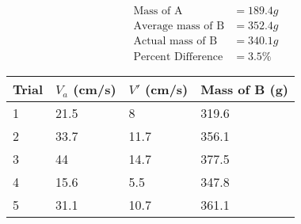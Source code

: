 \begin{equation*}
    \begin{aligned}
        \text{Mass of A}&=189.4g \\
        \text{Average mass of B}&=352.4g \\
        \text{Actual mass of B}&=340.1g \\
        \text{Percent Difference}&=3.5\%
    \end{aligned}    
\end{equation*}
\begin{table}[H]
    \begin{tabular}{|l|l|l|l|}
    \hline
    Trial & $V_a$ (cm/s) & $V'$ (cm/s) & Mass of B (g) \\ \hline
    1     & 21.5        & 8         & 319.6         \\ \hline
    2     & 33.7        & 11.7      & 356.1         \\ \hline
    3     & 44          & 14.7      & 377.5         \\ \hline
    4     & 15.6        & 5.5       & 347.8         \\ \hline
    5     & 31.1        & 10.7      & 361.1         \\ \hline
    \end{tabular}
    \end{table}
    